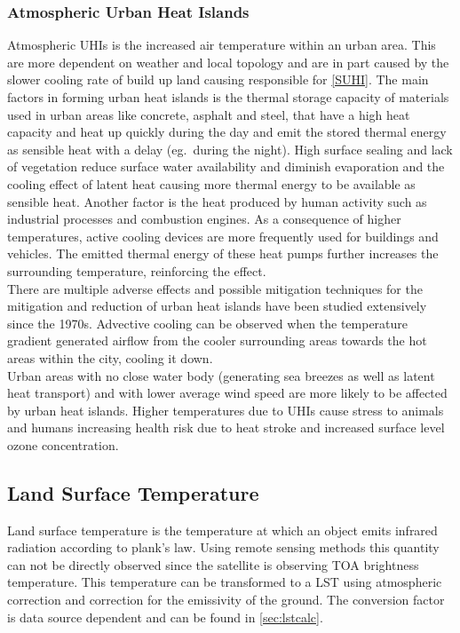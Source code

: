 \subsubsection{Atmospheric Urban Heat Islands} \label{sec:at_uhi}
Atmospheric \glspl{UHI} is the increased air temperature within an urban area. 
This 
are more dependent on weather and local topology and are in part caused by the slower cooling rate of build up land causing responsible for \cref{SUHI}.
The main factors in forming urban heat islands is the thermal storage capacity of materials used in urban areas like concrete, asphalt and steel, that have a high heat capacity and heat up quickly during the day and emit the stored thermal energy as sensible heat with a delay (eg.~during the night)\cite{Ramamurthy2014}. 
High surface sealing and lack of vegetation reduce surface water availability and diminish evaporation and the cooling effect of latent heat causing more thermal energy to be available as sensible heat. %
Another factor is the heat produced by human activity such as industrial processes and combustion engines.
As a consequence of higher temperatures, active cooling devices are more frequently used for buildings and vehicles. 
The emitted thermal energy of these heat pumps further increases the surrounding temperature, reinforcing the effect.
\\
There are multiple adverse effects and possible mitigation techniques for the mitigation and reduction of urban heat islands have been studied extensively since the 1970s\cite{Nichol1994}\cite{Stewart2011}. %
Advective cooling can be observed when the temperature gradient generated airflow from the cooler surrounding areas towards the hot areas within the city, cooling it down\cite{HaegerEugensson1999}. \\
Urban areas with no close water body (generating sea breezes as well as latent heat transport) and with lower average wind speed are more likely to be affected by urban heat islands\cite{Ramamurthy2017}. 
Higher temperatures due to \glspl{UHI} cause stress to animals and humans increasing health risk due to heat stroke and increased surface level ozone concentration\cite{Santamouris2020}.

\subsection{Land Surface Temperature}
Land surface temperature is the temperature at which an object emits infrared radiation according to plank's law\cite{Liang2020}. 
Using remote sensing methods this quantity can not be directly observed since the satellite is observing \gls{TOA} brightness temperature. 
This temperature can be transformed to a \gls{LST} using atmospheric correction and correction for the emissivity of the ground.
The conversion factor is data source dependent and can be found in \cref{sec:lstcalc}.

